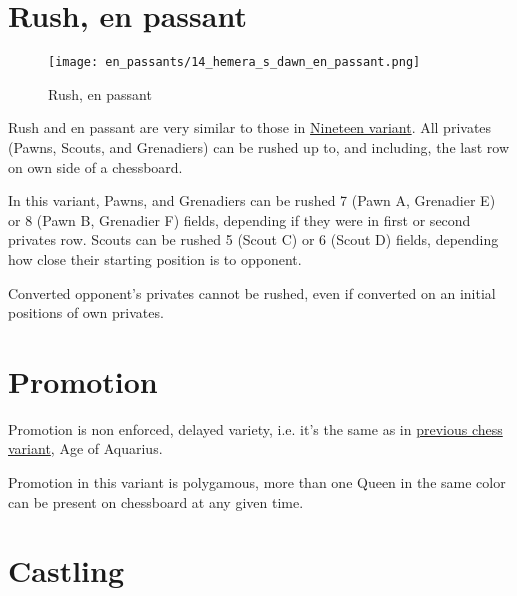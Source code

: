 \section*{Rush, en passant}
\label{sec:Hemera's Dawn/Rush, en passant}

\vspace*{-1.2\baselineskip}
\noindent
\begin{figure}[!h]
\texttt{[image: en\_passants/14\_hemera\_s\_dawn\_en\_passant.png]}
\vspace*{-1.3\baselineskip}
\caption{Rush, en passant}
\label{fig:14_hemera_s_dawn_en_passant}
\end{figure}

\vspace*{-0.5\baselineskip}
Rush and en passant are very similar to those in
\hyperref[fig:12_nineteen_en_passant]{Nineteen variant}.
All privates (Pawns, Scouts, and Grenadiers) can be rushed up to, and including,
the last row on own side of a chessboard.

In this variant, Pawns, and Grenadiers can be rushed 7 (Pawn A, Grenadier E) or 8
(Pawn B, Grenadier F) fields, depending if they were in first or second privates row.
Scouts can be rushed 5 (Scout C) or 6 (Scout D) fields, depending how close their
starting position is to opponent.

Converted opponent's privates cannot be rushed, even if converted on an initial
positions of own privates.


\section*{Promotion}
\label{sec:Hemera's Dawn/Promotion}

Promotion is non enforced, delayed variety, i.e. it's the same as in
\hyperref[sec:Age of Aquarius/Promotion]{previous chess variant}, Age of Aquarius.

Promotion in this variant is polygamous, more than one Queen in the same color
can be present on chessboard at any given time.

\clearpage %

\section*{Castling}
\label{sec:Hemera's Dawn/Castling}

